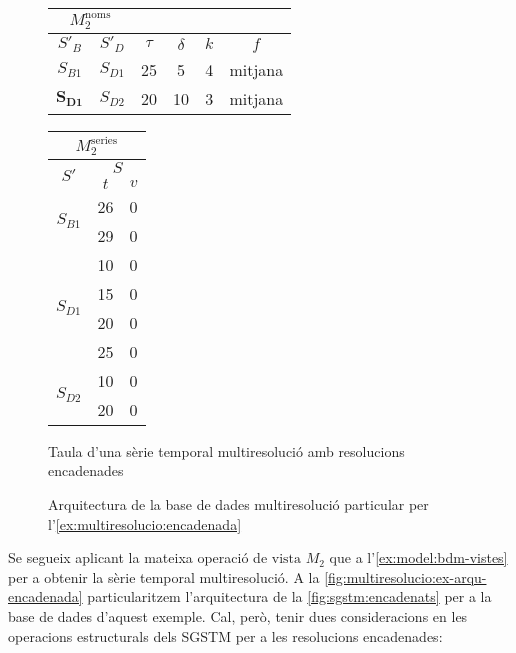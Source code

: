\begin{example} 
  \begin{figure}[tp]
    \centering
    \begin{tabular}{|c|c|c|c|c|c|}
      \multicolumn{2}{c}{$M_2^{\text{noms}}$} \\ \hline
      $S'_B$  & $S'_D$ & $\tau$ & $\delta$ & $k$ & $f$ \\ \hline
      $S_{B1}$ & $S_{D1}$ & 25 & 5  & 4 & mitjana  \\
      $\mathbf{S_{D1}}$ & $S_{D2}$ & 20 & 10 & 3 & mitjana  \\ \hline
    \end{tabular}\qquad
    \begin{tabular}{|c|c|c|}
      \multicolumn{3}{c}{$M_2^{\text{series}}$} \\ \hline
      \multirow{2}{*}{$S'$}  &  \multicolumn{2}{c|}{$S$} \\ \cline{2-3}
      & $t$      & $v$  \\ \hline
      \multirow{2}{*}{$S_{B1}$} 
      & 26 & 0 \\ 
      & 29 & 0 \\ \hline
      \multirow{4}{*}{$S_{D1}$} 
      & 10 & 0 \\ 
      & 15 & 0 \\ 
      & 20 & 0 \\ 
      & 25 & 0 \\ \hline
      \multirow{2}{*}{$S_{D2}$} 
      & 10 & 0 \\ 
      & 20 & 0 \\ \hline
    \end{tabular}
    \caption{Taula d'una sèrie temporal multiresolució amb resolucions encadenades}
    \label{fig:multiresolucio:exencadenat}
  \end{figure}




  \begin{figure}[tp]
    \centering
    
    \caption{Arquitectura de la base de dades multiresolució
      particular per l'\autoref{ex:multiresolucio:encadenada}}
    \label{fig:multiresolucio:ex-arqu-encadenada}
  \end{figure}



  Se segueix aplicant la mateixa operació de $\text{vista } M_2$ que a
  l'\autoref{ex:model:bdm-vistes} per a obtenir la sèrie temporal
  multiresolució. A la \autoref{fig:multiresolucio:ex-arqu-encadenada}
  particularitzem l'arquitectura de la \autoref{fig:sgstm:encadenats}
  per a la base de dades d'aquest exemple. Cal, però, tenir dues
  consideracions en les operacions estructurals dels \gls{SGSTM} per a
  les resolucions encadenades: 


\end{example}
